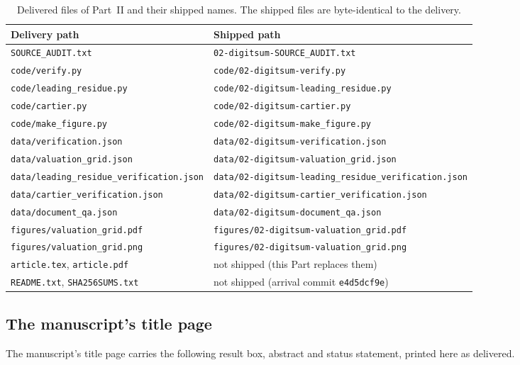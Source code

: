 \documentclass[11pt]{article}
\theoremstyle{definition}
\theoremstyle{remark}
\begin{document}
\begin{table}[htbp]
\centering\footnotesize
\begin{tabular}{@{}ll@{}}
\toprule
Delivery path & Shipped path\\
\midrule
\texttt{SOURCE\_AUDIT.txt} & \texttt{02-digitsum-SOURCE\_AUDIT.txt}\\
\texttt{code/verify.py} & \texttt{code/02-digitsum-verify.py}\\
\texttt{code/leading\_residue.py} & \texttt{code/02-digitsum-leading\_residue.py}\\
\texttt{code/cartier.py} & \texttt{code/02-digitsum-cartier.py}\\
\texttt{code/make\_figure.py} & \texttt{code/02-digitsum-make\_figure.py}\\
\texttt{data/verification.json} & \texttt{data/02-digitsum-verification.json}\\
\texttt{data/valuation\_grid.json} & \texttt{data/02-digitsum-valuation\_grid.json}\\
\texttt{data/leading\_residue\_verification.json} & \texttt{data/02-digitsum-leading\_residue\_verification.json}\\
\texttt{data/cartier\_verification.json} & \texttt{data/02-digitsum-cartier\_verification.json}\\
\texttt{data/document\_qa.json} & \texttt{data/02-digitsum-document\_qa.json}\\
\texttt{figures/valuation\_grid.pdf} & \texttt{figures/02-digitsum-valuation\_grid.pdf}\\
\texttt{figures/valuation\_grid.png} & \texttt{figures/02-digitsum-valuation\_grid.png}\\
\midrule
\texttt{article.tex}, \texttt{article.pdf} & not shipped (this Part replaces them)\\
\texttt{README.txt}, \texttt{SHA256SUMS.txt} & not shipped (arrival commit \texttt{e4d5dcf9e})\\
\bottomrule
\end{tabular}
\caption{Delivered files of Part~II and their shipped names. The shipped
files are byte-identical to the delivery.}
\label{lim:dsd:tab:files}
\end{table}

\subsection{The manuscript's title page}
\label{lim:dsd:sec:source-front}

The manuscript's title page carries the following result box, abstract and
status statement, printed here as delivered.
\end{document}
